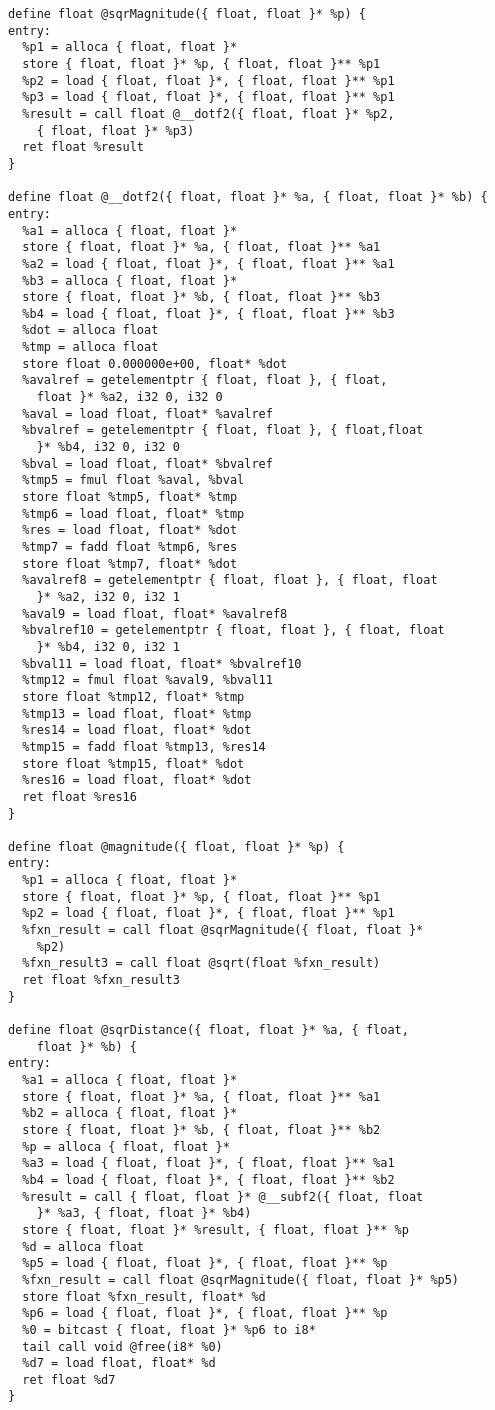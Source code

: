\documentclass[main.tex]{subfiles}
\begin{document}
{\begin{lstlisting}
define float @sqrMagnitude({ float, float }* %p) {
entry:
  %p1 = alloca { float, float }*
  store { float, float }* %p, { float, float }** %p1
  %p2 = load { float, float }*, { float, float }** %p1
  %p3 = load { float, float }*, { float, float }** %p1
  %result = call float @__dotf2({ float, float }* %p2,
    { float, float }* %p3)
  ret float %result
}

define float @__dotf2({ float, float }* %a, { float, float }* %b) {
entry:
  %a1 = alloca { float, float }*
  store { float, float }* %a, { float, float }** %a1
  %a2 = load { float, float }*, { float, float }** %a1
  %b3 = alloca { float, float }*
  store { float, float }* %b, { float, float }** %b3
  %b4 = load { float, float }*, { float, float }** %b3
  %dot = alloca float
  %tmp = alloca float
  store float 0.000000e+00, float* %dot
  %avalref = getelementptr { float, float }, { float,
    float }* %a2, i32 0, i32 0
  %aval = load float, float* %avalref
  %bvalref = getelementptr { float, float }, { float,float
    }* %b4, i32 0, i32 0
  %bval = load float, float* %bvalref
  %tmp5 = fmul float %aval, %bval
  store float %tmp5, float* %tmp
  %tmp6 = load float, float* %tmp
  %res = load float, float* %dot
  %tmp7 = fadd float %tmp6, %res
  store float %tmp7, float* %dot
  %avalref8 = getelementptr { float, float }, { float, float
    }* %a2, i32 0, i32 1
  %aval9 = load float, float* %avalref8
  %bvalref10 = getelementptr { float, float }, { float, float
    }* %b4, i32 0, i32 1
  %bval11 = load float, float* %bvalref10
  %tmp12 = fmul float %aval9, %bval11
  store float %tmp12, float* %tmp
  %tmp13 = load float, float* %tmp
  %res14 = load float, float* %dot
  %tmp15 = fadd float %tmp13, %res14
  store float %tmp15, float* %dot
  %res16 = load float, float* %dot
  ret float %res16
}

define float @magnitude({ float, float }* %p) {
entry:
  %p1 = alloca { float, float }*
  store { float, float }* %p, { float, float }** %p1
  %p2 = load { float, float }*, { float, float }** %p1
  %fxn_result = call float @sqrMagnitude({ float, float }*
    %p2)
  %fxn_result3 = call float @sqrt(float %fxn_result)
  ret float %fxn_result3
}

define float @sqrDistance({ float, float }* %a, { float,
    float }* %b) {
entry:
  %a1 = alloca { float, float }*
  store { float, float }* %a, { float, float }** %a1
  %b2 = alloca { float, float }*
  store { float, float }* %b, { float, float }** %b2
  %p = alloca { float, float }*
  %a3 = load { float, float }*, { float, float }** %a1
  %b4 = load { float, float }*, { float, float }** %b2
  %result = call { float, float }* @__subf2({ float, float
    }* %a3, { float, float }* %b4)
  store { float, float }* %result, { float, float }** %p
  %d = alloca float
  %p5 = load { float, float }*, { float, float }** %p
  %fxn_result = call float @sqrMagnitude({ float, float }* %p5)
  store float %fxn_result, float* %d
  %p6 = load { float, float }*, { float, float }** %p
  %0 = bitcast { float, float }* %p6 to i8*
  tail call void @free(i8* %0)
  %d7 = load float, float* %d
  ret float %d7
}


\end{lstlisting}}
\end{document}
